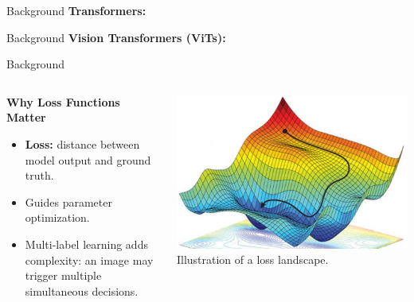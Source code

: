 
\begin{frame}{Background}
  \textbf{Transformers:}
\end{frame}


\begin{frame}{Background}
  \textbf{Vision Transformers (ViTs):}
\end{frame}

\begin{frame}{Background}
  \begin{columns}
    \begin{column}{0.55\textwidth}
      \textbf{Why Loss Functions Matter}
      \begin{itemize}
        \item \textbf{Loss:} distance between model output and ground truth.
        \item Guides parameter optimization.
        \item Multi-label learning adds complexity: an image may trigger multiple simultaneous decisions.
      \end{itemize}
    \end{column}

    \begin{column}{0.45\textwidth}
      \centering
      \includegraphics[width=0.9\linewidth]{Images/loss_optimization.png}\\
      \scriptsize Illustration of a loss landscape.
    \end{column}
  \end{columns}
\end{frame}

